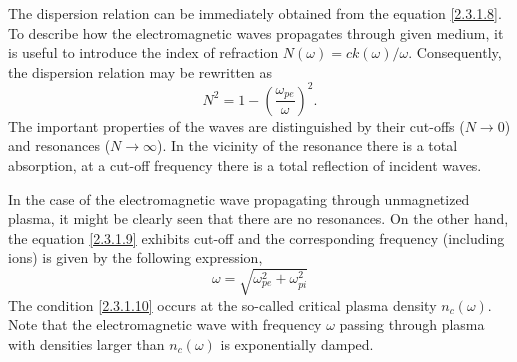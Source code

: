 The dispersion relation can be immediately obtained from the equation \ref{2.3.1.8}. To describe how the electromagnetic waves propagates through given medium, it is useful to introduce the index of refraction $ N \left( \omega \right) =  c k \left( \omega \right) / \omega $. Consequently, the dispersion relation may be rewritten as
\begin{equation}
\label{2.3.1.9}
N^{2} = 1 - \left(\frac{\omega_{pe}}{\omega}\right)^2.
\end{equation} 
The important properties of the waves are distinguished by their cut-offs ($ N \rightarrow 0 $) and resonances ($ N \rightarrow \infty $). In the vicinity of the resonance there is a total absorption, at a cut-off frequency there is a total reflection of incident waves.

In the case of the electromagnetic wave propagating through unmagnetized plasma, it might be clearly seen that there are no resonances. On the other hand, the equation \ref{2.3.1.9} exhibits cut-off and the corresponding frequency (including ions) is given by the following expression,
\begin{equation}
\label{2.3.1.10}
\omega = \sqrt{\omega_{pe}^{2} + \omega_{pi}^{2}}
\end{equation}
The condition \ref{2.3.1.10} occurs at the so-called critical plasma density $ n_c \left( \omega\right) $. Note that the electromagnetic wave with frequency $ \omega $ passing through plasma with densities larger than $ n_c \left( \omega\right) $ is exponentially damped.